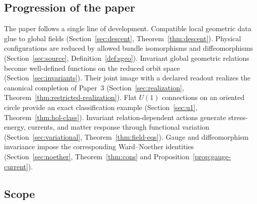 \documentclass[11pt,a4paper]{article}
\theoremstyle{plain}
\theoremstyle{definition}
\theoremstyle{remark}
\begin{document}
\subsection{Progression of the paper}

The paper follows a single line of development. Compatible local geometric data glue to global
fields (Section~\ref{sec:descent}, Theorem~\ref{thm:descent}). Physical configurations are
reduced by allowed bundle isomorphisms and diffeomorphisms (Section~\ref{sec:source},
Definition~\ref{def:sgeo}). Invariant global geometric relations become well-defined functions
on the reduced orbit space (Section~\ref{sec:invariants}). Their joint image with a declared
readout realizes the canonical completion of Paper~3 (Section~\ref{sec:realization},
Theorem~\ref{thm:restricted-realization}). Flat $U(1)$ connections on an oriented circle provide
an exact classification example (Section~\ref{sec:u1}, Theorem~\ref{thm:hol-class}). Invariant
relation-dependent actions generate stress-energy, currents, and matter response through
functional variation (Section~\ref{sec:variational}, Theorem~\ref{thm:field-eqs}). Gauge and
diffeomorphism invariance impose the corresponding Ward--Noether identities
(Section~\ref{sec:noether}, Theorem~\ref{thm:cons} and Proposition~\ref{prop:gauge-current}).

\subsection{Scope}
\label{sec:scope}
\end{document}
